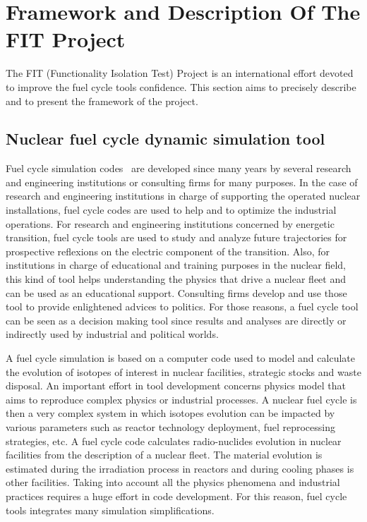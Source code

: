 \section{Framework and Description Of The FIT Project}

The FIT (Functionality Isolation Test) Project is an international effort
devoted to improve the fuel cycle tools confidence. This section aims to
precisely describe and to present the framework of the project.

\subsection{Nuclear fuel cycle dynamic simulation tool}

Fuel cycle simulation codes~\cite{NEA2016} are developed since many years by several research and engineering institutions or consulting firms for many purposes. In the case of research and engineering institutions in charge of supporting the operated nuclear installations, fuel cycle codes are used to help and to optimize the industrial operations. For research and engineering institutions concerned by energetic transition, fuel cycle tools are used to study and analyze future trajectories for prospective reflexions on the electric component of the transition. Also, for institutions in charge of educational and training purposes in the nuclear field, this kind of tool helps understanding the physics that drive a nuclear fleet and can be used as an educational support. Consulting firms develop and use those tool to provide enlightened advices to politics. For those reasons, a fuel cycle tool can be seen as a decision making tool since results and analyses are directly or indirectly used by industrial and political worlds.

A fuel cycle simulation is based on a computer code used to model and calculate the evolution of isotopes of interest in nuclear facilities, strategic stocks and waste disposal. An important effort in tool development concerns physics model that aims to reproduce complex physics or industrial processes. A nuclear fuel cycle is then a very complex system in which isotopes evolution can be impacted by various parameters such as reactor technology deployment, fuel reprocessing strategies, etc. A fuel cycle code calculates radio-nuclides evolution in nuclear facilities from the description of a nuclear fleet. The material evolution is estimated during the irradiation process in reactors and during cooling phases is other facilities. Taking into account all the physics phenomena and industrial practices requires a huge effort in code development. For this reason, fuel cycle tools integrates many simulation simplifications.

